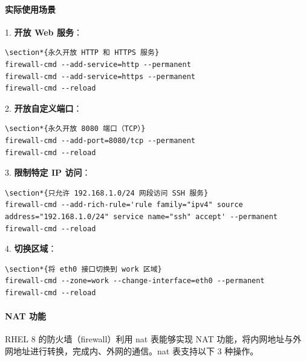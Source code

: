 \documentclass[12pt,UTF8]{ctexbook}
\begin{document}
\paragraph{实际使用场景}

1. \textbf{开放 Web 服务}：
\begin{verbatim}
\section*{永久开放 HTTP 和 HTTPS 服务}
firewall-cmd --add-service=http --permanent
firewall-cmd --add-service=https --permanent
firewall-cmd --reload
\end{verbatim}

2. \textbf{开放自定义端口}：
\begin{verbatim}
\section*{永久开放 8080 端口（TCP）}
firewall-cmd --add-port=8080/tcp --permanent
firewall-cmd --reload
\end{verbatim}

3. \textbf{限制特定 IP 访问}：
\begin{verbatim}
\section*{只允许 192.168.1.0/24 网段访问 SSH 服务}
firewall-cmd --add-rich-rule='rule family="ipv4" source address="192.168.1.0/24" service name="ssh" accept' --permanent
firewall-cmd --reload
\end{verbatim}

4. \textbf{切换区域}：
\begin{verbatim}
\section*{将 eth0 接口切换到 work 区域}
firewall-cmd --zone=work --change-interface=eth0 --permanent
firewall-cmd --reload
\end{verbatim}

\paragraph{NAT 功能}
RHEL 8 的防火墙（firewall）利用 nat 表能够实现 NAT 功能，将内网地址与外网地址进行转换，完成内、外网的通信。nat 表支持以下 3 种操作。
\end{document}
